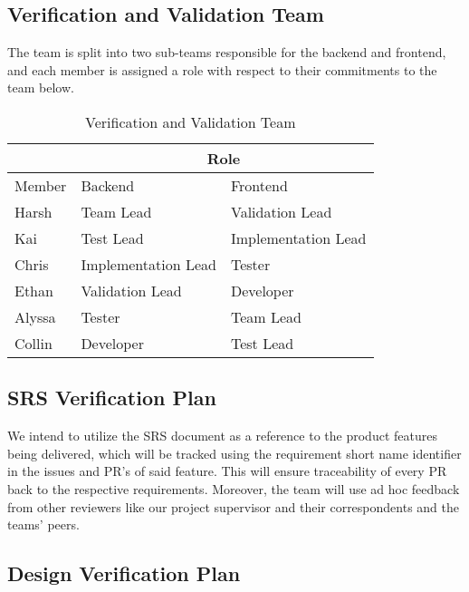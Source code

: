 \documentclass[12pt, titlepage]{article}
\begin{document}
\subsection{Verification and Validation Team}

The team is split into two sub-teams responsible for the backend and frontend, and each member is assigned a role with respect to their commitments to the team below.

\begin{table}[h!]
    \centering
    \begin{tabular}{|l|ll|}
        \hline
                    & \multicolumn{2}{c|}{Role}                                      \\ \hline
        Member      & \multicolumn{1}{l|}{Backend}             & Frontend            \\ \hline
        Harsh       & \multicolumn{1}{l|}{Team Lead}           & Validation Lead     \\ \hline
        Kai         & \multicolumn{1}{l|}{Test Lead}           & Implementation Lead \\ \hline
        Chris       & \multicolumn{1}{l|}{Implementation Lead} & Tester              \\ \hline
        Ethan       & \multicolumn{1}{l|}{Validation Lead}     & Developer           \\ \hline
        Alyssa      & \multicolumn{1}{l|}{Tester}              & Team Lead           \\ \hline
        Collin      & \multicolumn{1}{l|}{Developer}           & Test Lead           \\ \hline
    \end{tabular}
    \caption{Verification and Validation Team}
\end{table}

\subsection{SRS Verification Plan}

We intend to utilize the SRS document as a reference to the product features being delivered, which will be tracked using the requirement short name identifier in the issues and PR's of said feature. This will ensure traceability of every PR back to the respective requirements. Moreover, the team will use ad hoc feedback from other reviewers like our project supervisor and their correspondents and the teams' peers.

\subsection{Design Verification Plan}
\end{document}

